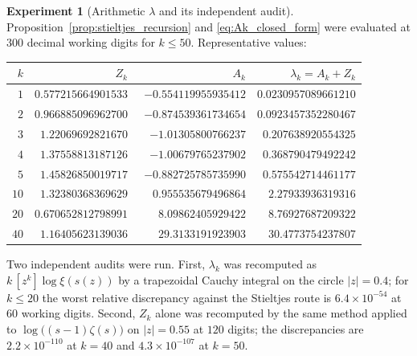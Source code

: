 \documentclass[11pt]{amsart}
\numberwithin{equation}{section}
\theoremstyle{plain}
\theoremstyle{definition}
\newtheorem{experiment}[theorem]{Experiment}
\theoremstyle{remark}
\begin{document}
\begin{experiment}[Arithmetic $\lambda$ and its independent audit]
\label{exp:arithmetic_lambda}
Proposition~\ref{prop:stieltjes_recursion} and \eqref{eq:Ak_closed_form} were evaluated at
$300$ decimal working digits for $k\le50$.  Representative values:
\begin{center}
\small
\begin{tabular}{rrrr}
\toprule
$k$ & $Z_k$ & $A_k$ & $\lambda_k=A_k+Z_k$\\
\midrule
$1$ & $0.577215664901533$ & $-0.554119955935412$ & $0.0230957089661210$\\
$2$ & $0.966885096962700$ & $-0.874539361734654$ & $0.0923457352280467$\\
$3$ & $1.22069692821670$ & $-1.01305800766237$ & $0.207638920554325$\\
$4$ & $1.37558813187126$ & $-1.00679765237902$ & $0.368790479492242$\\
$5$ & $1.45826850019717$ & $-0.882725785735990$ & $0.575542714461177$\\
$10$ & $1.32380368369629$ & $\phantom{-}0.955535679496864$ & $2.27933936319316$\\
$20$ & $0.670652812798991$ & $\phantom{-}8.09862405929422$ & $8.76927687209322$\\
$40$ & $1.16405623139036$ & $\phantom{-}29.3133191923903$ & $30.4773754237807$\\
\bottomrule
\end{tabular}
\end{center}

Two independent audits were run.  First, $\lambda_k$ was recomputed as
$k\,[z^k]\log\xi(s(z))$ by a trapezoidal Cauchy integral on the circle $|z|=0.4$; for
$k\le20$ the worst relative discrepancy against the Stieltjes route is
$6.4\times10^{-54}$ at $60$ working digits.  Second, $Z_k$ alone was recomputed by the
same method applied to $\log\bigl((s-1)\zeta(s)\bigr)$ on $|z|=0.55$ at $120$ digits; the
discrepancies are $2.2\times10^{-110}$ at $k=40$ and $4.3\times10^{-107}$ at $k=50$.


\end{experiment}
\end{document}
